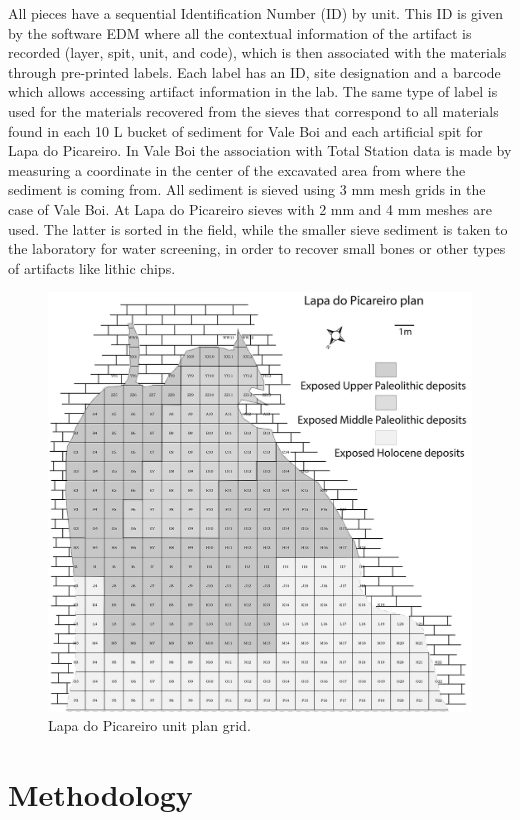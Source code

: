 \documentclass[12pt,twoside]{reedthesis}
\begin{document}
All pieces have a sequential Identification Number (ID) by unit. This ID is given by the software EDM where all the contextual information of the artifact is recorded (layer, spit, unit, and code), which is then associated with the materials through pre-printed labels. Each label has an ID, site designation and a barcode which allows accessing artifact information in the lab. The same type of label is used for the materials recovered from the sieves that correspond to all materials found in each 10 L bucket of sediment for Vale Boi and each artificial spit for Lapa do Picareiro. In Vale Boi the association with Total Station data is made by measuring a coordinate in the center of the excavated area from where the sediment is coming from. All sediment is sieved using 3 mm mesh grids in the case of Vale Boi. At Lapa do Picareiro sieves with 2 mm and 4 mm meshes are used. The latter is sorted in the field, while the smaller sieve sediment is taken to the laboratory for water screening, in order to recover small bones or other types of artifacts like lithic chips.
\begin{figure}
\includegraphics[width=1\linewidth]{figure/LP_units} \caption{Lapa do Picareiro unit plan grid.}\label{fig:unnamed-chunk-8}
\end{figure}
\hypertarget{methodology}{%
\chapter{Methodology}\label{methodology}}
\end{document}
